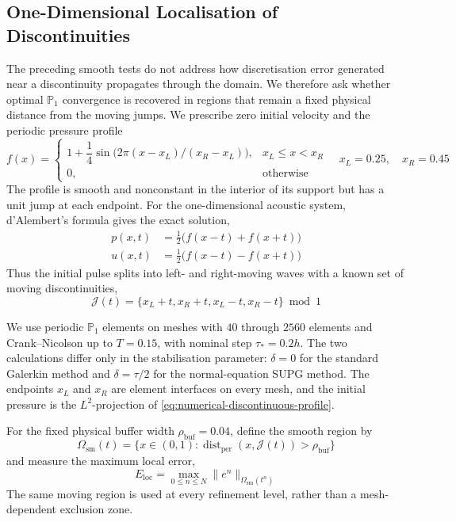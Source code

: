 \documentclass[11pt]{article}
\begin{document}

\subsection{One-Dimensional Localisation of Discontinuities}
\label{subsec:numerical-one-dimensional-localisation}
The preceding smooth tests do not address how discretisation error generated
near a discontinuity propagates through the domain. We therefore ask whether optimal
\(\mathbb P_1\) convergence is recovered in regions that remain a fixed physical
distance from the moving jumps. We prescribe zero initial velocity and the
periodic pressure profile
\begin{equation}
f(x)=
\begin{cases}
1+\dfrac14\sin\bigl(2\pi(x-x_L)/(x_R-x_L)\bigr),&x_L\le x<x_R\\
0,&\text{otherwise}
\end{cases}
\quad x_L=0.25,\quad x_R=0.45 \label{eq:numerical-discontinuous-profile}
\end{equation}
The profile is smooth and nonconstant in the interior of its support but has a
unit jump at each endpoint. For the one-dimensional acoustic system,
d'Alembert's formula gives the exact solution,
\begin{align}
p(x,t)&=\frac12\bigl(f(x-t)+f(x+t)\bigr)
\label{eq:numerical-dalembert-pressure}\\
u(x,t)&=\frac12\bigl(f(x-t)-f(x+t)\bigr)
\label{eq:numerical-dalembert-velocity}
\end{align}
Thus the initial pulse splits into left- and right-moving waves with a known
set of moving discontinuities,
\begin{equation}
\mathcal J(t)=\{x_L+t,x_R+t,x_L-t,x_R-t\}\bmod 1
\label{eq:numerical-moving-jump-set}
\end{equation}

We use periodic \(\mathbb P_1\) elements on meshes with \(40\) through \(2560\)
elements and Crank--Nicolson up to \(T=0.15\), with nominal step
\(\tau_*=0.2h\). The two calculations differ only in the stabilisation
parameter: \(\delta=0\) for the standard Galerkin method and
\(\delta=\tau/2\) for the normal-equation SUPG method. The endpoints \(x_L\)
and \(x_R\) are element interfaces on every mesh, and the initial pressure is
the \(L^2\)-projection of \eqref{eq:numerical-discontinuous-profile}.

For the fixed physical buffer width \(\rho_{\mathrm{buf}}=0.04\), define the
smooth region by
\begin{equation}
\Omega_{\mathrm{sm}}(t)
=\bigl\{x\in(0,1):\operatorname{dist}_{\mathrm{per}}
(x,\mathcal J(t))>\rho_{\mathrm{buf}}\bigr\} \label{eq:numerical-smooth-region}
\end{equation}
and measure the maximum local error,
\begin{equation}
E_{\mathrm{loc}}
=\max_{0\le n\le N}\|e^n\|_{\Omega_{\mathrm{sm}}(t^n)}
\label{eq:numerical-local-error}
\end{equation}
The same moving region is used at every refinement level, rather than a
mesh-dependent exclusion zone.
\end{document}
